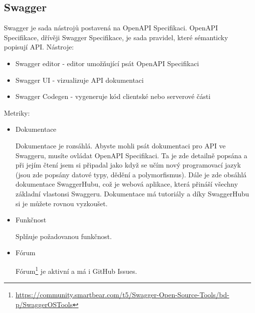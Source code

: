 \documentclass[thesis=B,czech]{FITthesis}[2012/06/26]
\begin{document}
        \subsection{Swagger}
            Swagger je sada nástrojů postavená na OpenAPI Specifikaci. OpenAPI Specifikace, dřívěji Swagger Specifikace, je sada pravidel, které sémanticky popisují API. Nástroje:
            \begin{itemize}
                \item Swagger editor - editor umožňující psát OpenAPI Specifikaci
                \item Swagger UI - vizualizuje API dokumentaci
                \item Swagger Codegen - vygeneruje kód clientské nebo serverové části
            \end{itemize}
            Metriky:
            \begin{itemize}
                \item Dokumentace
                
                    Dokumentace je rozsáhlá. Abyste mohli psát dokumentaci pro API ve Swaggeru, musíte ovládat OpenAPI Specifikaci. Ta je zde detailně popsána a při jejím čtení jsem si připadal jako když se učím nový programovací jazyk (jsou zde popsány datové typy, dědění a polymorfismus). Dále je zde obsáhlá dokumentace SwaggerHubu, což je webová aplikace, která přináší všechny základní vlastonsi Swaggeru. Dokumentace má tutoriály a díky SwaggerHubu si je můžete rovnou vyzkoušet.
                \item Funkčnost
                
                    Splňuje požadovanou funkčnost.
                \item Fórum
                
                    Fórum\footnote{\url{https://community.smartbear.com/t5/Swagger-Open-Source-Tools/bd-p/SwaggerOSTools}} je aktivní a má i GitHub Issues.
            \end{itemize}
            \cite{swagger}
\end{document}
